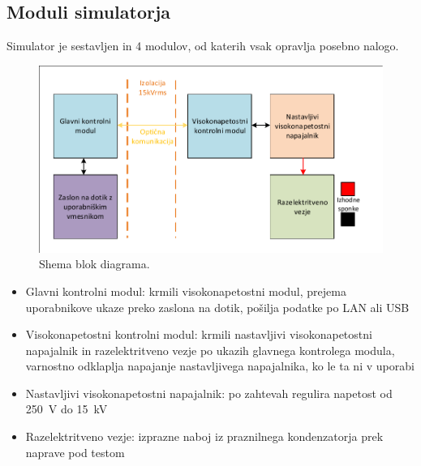\documentclass[a4paper,twoside,openright,12pt,slovene]{book}
\begin{document}
	\subsection{Moduli simulatorja}
	Simulator je sestavljen in 4 modulov, od katerih vsak opravlja posebno nalogo.
	\begin{figure}[h]
    \centering
    \includegraphics[width=1\columnwidth]{Sheme/Osnovna blok shema poenostavljena.pdf}
    \caption{\label{BlokDiagramShema} Shema blok diagrama.}
	\end{figure}
	
	\begin{itemize}
		\item Glavni kontrolni modul: krmili visokonapetostni modul, prejema uporabnikove ukaze preko zaslona na dotik, pošilja podatke po LAN ali USB
		\item Visokonapetostni kontrolni modul: krmili nastavljivi visokonapetostni napajalnik in razelektritveno vezje po ukazih glavnega kontrolega modula, varnostno odklaplja napajanje nastavljivega napajalnika, ko le ta ni v uporabi
		\item Nastavljivi visokonapetostni napajalnik: po zahtevah regulira napetost od \SI{250}{\volt} do \SI{15}{\kilo\volt}
		\item Razelektritveno vezje: izprazne naboj iz praznilnega kondenzatorja prek naprave pod testom
	\end{itemize}
\end{document}
